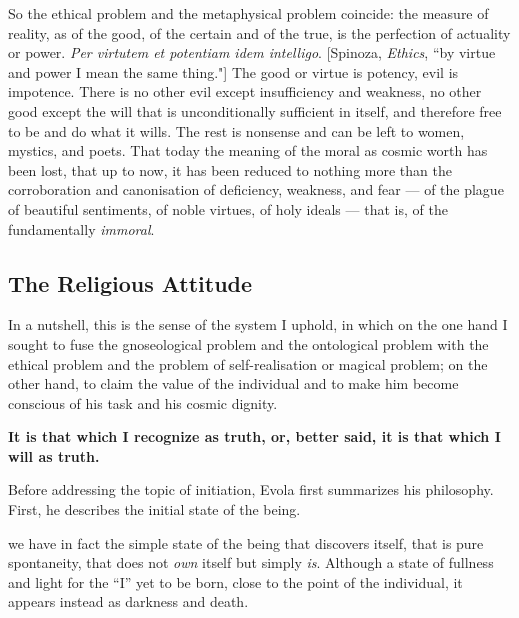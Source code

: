 \begin{quotex}
So the ethical problem and the metaphysical problem coincide: the measure of reality, as of the good, of the certain and of the true, is the perfection of actuality or power. \emph{Per virtutem et potentiam idem intelligo}. [Spinoza, \emph{Ethics}, ``by virtue and power I mean the same thing."] The good or virtue is potency, evil is impotence. There is no other evil except insufficiency and weakness, no other good except the will that is unconditionally sufficient in itself, and therefore free to be and do what it wills. The rest is nonsense and can be left to women, mystics, and poets. That today the meaning of the moral as cosmic worth has been lost, that up to now, it has been reduced to nothing more than the corroboration and canonisation of deficiency, weakness, and fear — of the plague of beautiful sentiments, of noble virtues, of holy ideals — that is, of the fundamentally \emph{immoral}. 

\end{quotex}

\subsection*{The Religious Attitude}

\begin{quotex}
In a nutshell, this is the sense of the system I uphold, in which on the one hand I sought to fuse the gnoseological problem and the ontological problem with the ethical problem and the problem of self-realisation or magical problem; on the other hand, to claim the value of the individual and to make him become conscious of his task and his cosmic dignity.

\textbf{It is that which I recognize as truth, or, better said, it is that which I will as truth.}
\end{quotex}


Before addressing the topic of initiation, Evola first summarizes his philosophy. First, he describes the initial state of the being.

\begin{quotex}
we have in fact the simple state of the being that discovers itself, that is pure spontaneity, that does not \emph{own} itself but simply \emph{is}. Although a state of fullness and light for the ``I'' yet to be born, close to the point of the individual, it appears instead as darkness and death.
\end{quotex}


